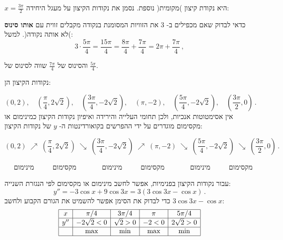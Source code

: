 \documentclass[12pt,a4paper]{article}
\begin{document}
$\displaystyle x=\frac{3\pi}{2}$
היא נקודת קיצון )מקומית( נוספת. נסמן את נקודות הקיצון על מעגל היחידה:
\begin{center}
\end{center}
כדאי לבדוק שאם מכפילים ב-%
$3$
את הזוויות המסומנת בנקודה מקבלים זווית עם
\textbf{אותו סינוס}
)לא אותה נקודה(. למשל:
\[
3\cdot \frac{5\pi}{4} = \frac{15\pi}{4} = \frac{8\pi}{4}+\frac{7\pi}{4}= 2\pi + \frac{7\pi}{4}\,,
\]

והסינוס של
$\displaystyle \frac{7\pi}{4}$
שווה לסינוס של
$\displaystyle \frac{5\pi}{4}$.

נקודות הקיצון הן:

\[
(0,2),\quad \left(\frac{\pi}{4},2\sqrt{2}\right),\quad \left(\frac{3\pi}{4},-2\sqrt{2}\right),\quad (\pi,-2),\quad \left(\frac{5\pi}{4},-2\sqrt{2}\right),\quad \left(\frac{3\pi}{2},0\right)\,.
\]
אין אסימטוטות אנכיות, ולכן תחומי העלייה והירידה ואיפיון נקודות הקיצון כמינימום או מקסימום מוגדרים על ידי ההפרשים בקואורדינטות ה-%
$y$
של נקודות הקיצון:

\[
(0,2) \;\nearrow \; \left(\frac{\pi}{4},2\sqrt{2}\right) \;\searrow \;  \left(\frac{3\pi}{4},-2\sqrt{2}\right) \;\nearrow \;  (\pi,-2) \;\searrow \;  \left(\frac{5\pi}{4},-2\sqrt{2}\right) \;\searrow \;  \left(\frac{3\pi}{2},0\right)\,.
\]

\vspace{-4ex}
$\quad$
מקסימום
$\quad\quad$
מינימום
$\quad\quad\quad$
מקסימום
$\quad\quad$
מינימום 
$\quad\quad\quad$
מקסימום
$\quad\quad$
מינימום 

עבור נקודות הקיצון בפנימיות, אפשר לחשב מינימום או מקסימום לפי הנגזרת השנייה:
\[
y'' = -3\cos x + 9\cos 3x=3(3\cos 3x-\cos x)\,.
\]
כדי לבדוק את הסימן אפשר להשמיט את הגורם הקבוע ולחשב
$3\cos 3x-\cos x$:
\[
\begin{array}{|c|c|c|c|c|}
\hline
x& \pi/4 & 3\pi/4 & \pi & 5\pi/4 \\\hline
y''& -2\sqrt{2}<0&\sqrt{2}>0 & -2<0&2\sqrt{2}>0 \\\hline
& \textrm{max}& \textrm{min}& \textrm{max}&\textrm{min}\\\hline
\end{array}
\]
\end{document}
